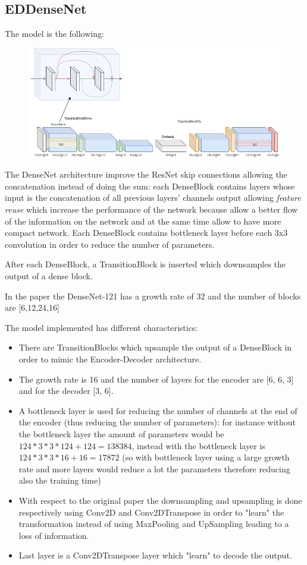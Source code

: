 \subsection{EDDenseNet}
The model is the following:
\begin{figure}[H]
    \centering
    \includegraphics[scale=0.5]{subsections/densenet/densenet.png}
\end{figure}

The DenseNet\cite{densenet} architecture improve the ResNet skip connections allowing the concatenation instead of doing the sum: each DenseBlock contains layers whose input is the concatenation of all previous layers' channels output allowing \textit{feature reuse} which increase the performance of the network because allow a better flow of the information on the network and at the same time allow to have more compact network.
Each DenseBlock contains bottleneck layer before each 3x3 convolution in order to reduce the number of parameters.

After each DenseBlock, a TransitionBlock is inserted which downsamples the output of a dense block.

In the paper the DenseNet-121 has a growth rate of 32 and the number of blocks are [6,12,24,16]  

The model implemented has different characteristics:
\begin{itemize}
    \item There are TransitionBlocks which upsample the output of a DenseBlock in order to mimic the Encoder-Decoder architecture.
    \item The growth rate is 16 and the number of layers for the encoder are [6, 6, 3] and for the decoder [3, 6].
    \item A bottleneck layer is used for reducing the number of channels at the end of the encoder (thus reducing the number of parameters): for instance without the bottleneck layer the amount of parameters would be $124*3*3*124+124=138384$, instead with the bottleneck layer is $124*3*3*16+16 = 17872$ (so with bottleneck layer using a large growth rate and more layers would reduce a lot the parameters therefore reducing also the training time)
    \item With respect to the original paper the downsampling and upsampling is done respectively using Conv2D and Conv2DTranspose in order to "learn" the transformation instead of using MaxPooling and UpSampling leading to a loss of information.
    \item Last layer is a Conv2DTranspose layer which "learn" to decode the output.
\end{itemize}
